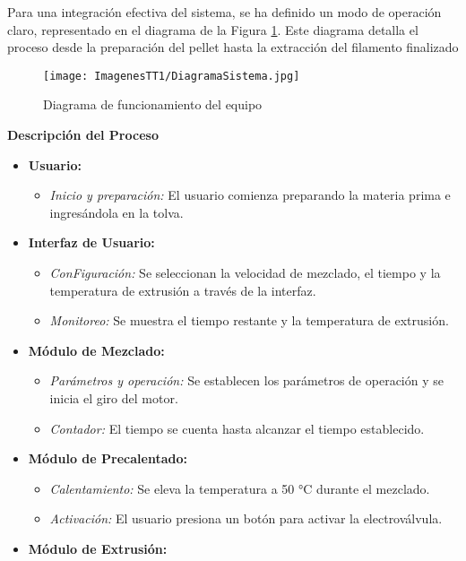 \documentclass[14pt,oneside]{extarticle} %
\begin{document}
Para una integración efectiva del sistema, se ha definido un modo de operación claro, representado en el diagrama de la Figura \ref{fig:diagrama_funcionamiento}. Este diagrama detalla el proceso desde la preparación del pellet hasta la extracción del filamento finalizado

\begin{figure}[h]
    \centering
    \texttt{[image: ImagenesTT1/DiagramaSistema.jpg]}
    \caption{Diagrama de funcionamiento del equipo}
    \label{fig:diagrama_funcionamiento}
\end{figure}

\textbf{Descripción del Proceso}

\begin{itemize}
    \item \textbf{Usuario:}
    \begin{itemize}
        \item \textit{Inicio y preparación:} El usuario comienza preparando la materia prima e ingresándola en la tolva.
    \end{itemize}
    \item \textbf{Interfaz de Usuario:}
    \begin{itemize}
        \item \textit{ConFiguración:} Se seleccionan la velocidad de mezclado, el tiempo y la temperatura de extrusión a través de la interfaz.
        \item \textit{Monitoreo:} Se muestra el tiempo restante y la temperatura de extrusión.
    \end{itemize}
    \item \textbf{Módulo de Mezclado:}
    \begin{itemize}
        \item \textit{Parámetros y operación:} Se establecen los parámetros de operación y se inicia el giro del motor.
        \item \textit{Contador:} El tiempo se cuenta hasta alcanzar el tiempo establecido.
    \end{itemize}
    \item \textbf{Módulo de Precalentado:}
    \begin{itemize}
        \item \textit{Calentamiento:} Se eleva la temperatura a 50 °C durante el mezclado.
        \item \textit{Activación:} El usuario presiona un botón para activar la electroválvula.
    \end{itemize}
    \item \textbf{Módulo de Extrusión:}

\end{itemize}
\end{document}
